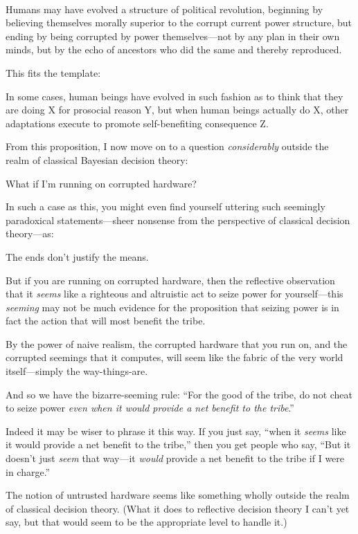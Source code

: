 \bigskip

{
 ~}

{
 Humans may have evolved a structure of political revolution,
beginning by believing themselves morally superior to the corrupt
current power structure, but ending by being corrupted by power
themselves{}---not by any plan in their own minds, but by the echo of
ancestors who did the same and thereby reproduced.}

{
 This fits the template:}

{
 In some cases, human beings have evolved in such fashion as to
think that they are doing X for prosocial reason Y, but when human
beings actually do X, other adaptations execute to promote
self-benefiting consequence Z.}

{
 From this proposition, I now move on to a question
\textit{considerably} outside the realm of classical Bayesian decision
theory:}

{
 What if I'm running on corrupted hardware?}

{
 In such a case as this, you might even find yourself uttering such
seemingly paradoxical statements---sheer nonsense from the perspective
of classical decision theory---as:}

{
 The ends don't justify the means.}

{
 But if you are running on corrupted hardware, then the reflective
observation that it \textit{seems} like a righteous and altruistic act
to seize power for yourself---this \textit{seeming} may not be much
evidence for the proposition that seizing power is in fact the action
that will most benefit the tribe.}

{
 By the power of naive realism, the corrupted hardware that you run
on, and the corrupted seemings that it computes, will seem like the
fabric of the very world itself---simply the way-things-are.}

{
 And so we have the bizarre-seeming rule: ``For
the good of the tribe, do not cheat to seize power \textit{even when it
would provide a net benefit to the tribe}.''}

{
 Indeed it may be wiser to phrase it this way. If you just say,
``when it \textit{seems} like it would provide a net
benefit to the tribe,'' then you get people who say,
``But it doesn't just \textit{seem}
that way---it \textit{would} provide a net benefit to the tribe if I
were in charge.''}

{
 The notion of untrusted hardware seems like something wholly
outside the realm of classical decision theory. (What it does to
reflective decision theory I can't yet say, but that
would seem to be the appropriate level to handle it.)}

